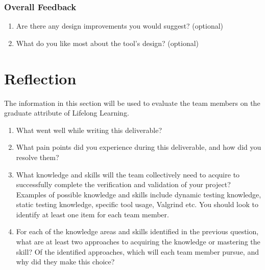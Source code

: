 \documentclass[12pt, titlepage]{article}
\begin{document}
\begin{appendices}
\subsubsection*{Overall Feedback}
\begin{enumerate}
  \item Are there any design improvements you would suggest? (optional)
  \item What do you like most about the tool’s design? (optional)
\end{enumerate}

\newpage{}
\section{Reflection}


The information in this section will be used to evaluate the team members on the
graduate attribute of Lifelong Learning.



\begin{enumerate}
  \item What went well while writing this deliverable? 
  \item What pain points did you experience during this deliverable, and how
    did you resolve them?
  \item What knowledge and skills will the team collectively need to acquire to
  successfully complete the verification and validation of your project?
  Examples of possible knowledge and skills include dynamic testing knowledge,
  static testing knowledge, specific tool usage, Valgrind etc.  You should look to
  identify at least one item for each team member.
  \item For each of the knowledge areas and skills identified in the previous
  question, what are at least two approaches to acquiring the knowledge or
  mastering the skill?  Of the identified approaches, which will each team
  member pursue, and why did they make this choice?
\end{enumerate}

\end{appendices}
\end{document}
